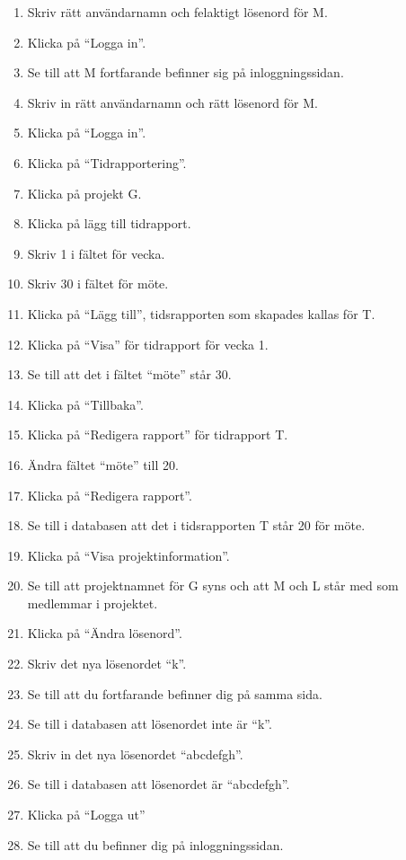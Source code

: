 \documentclass[a4paper]{article}
\begin{document}
\begin{ST}
\begin{enumerate}
\item Skriv rätt användarnamn och felaktigt lösenord för M.
\item Klicka på ``Logga in''.
\item Se till att M fortfarande befinner sig på inloggningssidan.
\item Skriv in rätt användarnamn och rätt lösenord för M.
\item Klicka på ``Logga in''.
\item Klicka på ``Tidrapportering''.
\item Klicka på projekt G.
\item Klicka på lägg till tidrapport.
\item Skriv 1 i fältet för vecka.
\item Skriv 30 i fältet för möte.
\item Klicka på ``Lägg till'', tidsrapporten som skapades kallas för T.
\item Klicka på ``Visa'' för tidrapport för vecka 1.
\item Se till att det i fältet ``möte'' står 30.
\item Klicka på ``Tillbaka''.
\item Klicka på ``Redigera rapport'' för tidrapport T.
\item Ändra fältet ``möte'' till 20.
\item Klicka på ``Redigera rapport''.
\item Se till i databasen att det i tidsrapporten T står 20 för möte.
\item Klicka på ``Visa projektinformation''.
\item Se till att projektnamnet för G syns och att M och L står med som medlemmar i projektet.
\item Klicka på ``Ändra lösenord''.
\item Skriv det nya lösenordet ``k''.
\item Se till att du fortfarande befinner dig på samma sida.
\item Se till i databasen att lösenordet inte är ``k''.
\item Skriv in det nya lösenordet ``abcdefgh''.
\item Se till i databasen att lösenordet är ``abcdefgh''.
\item Klicka på ``Logga ut''
\item Se till att du befinner dig på inloggningssidan.

\end{enumerate}

\end{ST}
\end{document}
